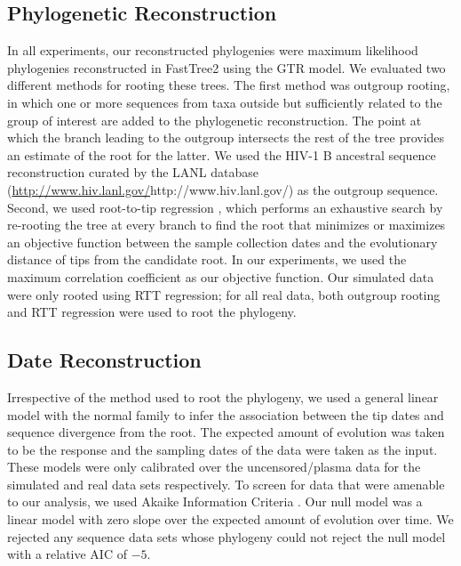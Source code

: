 \documentclass[12pt]{article}
\begin{document}
\subsection * {Phylogenetic Reconstruction} \label{subsec:phylo}
In all experiments, our reconstructed phylogenies were maximum likelihood phylogenies reconstructed in FastTree2 using the GTR model.
We evaluated two different methods for rooting these trees. 
The first method was outgroup rooting, in which one or more sequences from taxa outside but sufficiently related to the group of interest are added to the phylogenetic reconstruction.
The point at which the branch leading to the outgroup intersects the rest of the tree provides an estimate of the root for the latter.
We used the HIV-1 B ancestral sequence reconstruction curated by the LANL database (\url{http://www.hiv.lanl.gov/}{http://www.hiv.lanl.gov/}) as the outgroup sequence.
Second, we used root-to-tip regression \citep[RTT;][]{Korber00}, which performs an exhaustive search by re-rooting the tree at every branch to find the root that minimizes or maximizes an objective function between the sample collection dates and the evolutionary distance of tips from the candidate root.
In our experiments, we used the maximum correlation coefficient as our objective function.
Our simulated data were only rooted using RTT regression; for all real data, both outgroup rooting and RTT regression were used to root the phylogeny. 


\subsection * {Date Reconstruction} \label{subsec:daterecon}

Irrespective of the method used to root the phylogeny, we used a general linear model with the normal family to infer the association between the tip dates and sequence divergence from the root. 
The expected amount of evolution was taken to be the response and the sampling dates of the data were taken as the input. 
These models were only calibrated over the uncensored/plasma data for the simulated and real data sets respectively.
To screen for data that were amenable to our analysis, we used Akaike Information Criteria \cite[AIC;][]{Akaike74}.
Our null model was a linear model with zero slope over the expected amount of evolution over time.
We rejected any sequence data sets whose phylogeny could not reject the null model with a relative AIC of ${-5}$.
\end{document}
